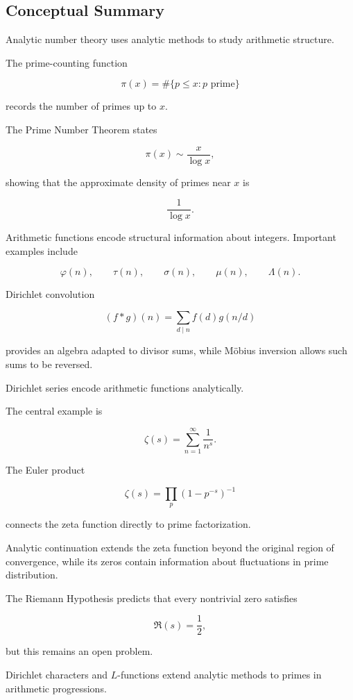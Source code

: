 \subsection{Conceptual Summary}
\label{subsec:analytic-number-theory-summary}

Analytic number theory uses analytic methods to study arithmetic structure.

The prime-counting function

\[ \pi(x)=\#\{p\leq x:p\text{ prime}\} \]

records the number of primes up to \(x\).

The Prime Number Theorem states

\[ \boxed{\pi(x)\sim\frac{x}{\log x}}, \]

showing that the approximate density of primes near \(x\) is

\[ \frac1{\log x}. \]

Arithmetic functions encode structural information about integers.
Important examples include

\[ \varphi(n),\qquad\tau(n),\qquad\sigma(n),\qquad\mu(n),\qquad\Lambda(n). \]

Dirichlet convolution

\[ (f*g)(n)=\sum_{d\mid n}f(d)g(n/d) \]

provides an algebra adapted to divisor sums, while Möbius inversion allows
such sums to be reversed.

Dirichlet series encode arithmetic functions analytically.

The central example is

\[ \zeta(s)=\sum_{n=1}^{\infty}\frac1{n^s}. \]

The Euler product

\[ \boxed{\zeta(s)=\prod_p(1-p^{-s})^{-1}} \]

connects the zeta function directly to prime factorization.

Analytic continuation extends the zeta function beyond the original region
of convergence, while its zeros contain information about fluctuations in
prime distribution.

The Riemann Hypothesis predicts that every nontrivial zero satisfies

\[ \Re(s)=\frac12, \]

but this remains an open problem.

Dirichlet characters and \(L\)-functions extend analytic methods to primes in
arithmetic progressions.

